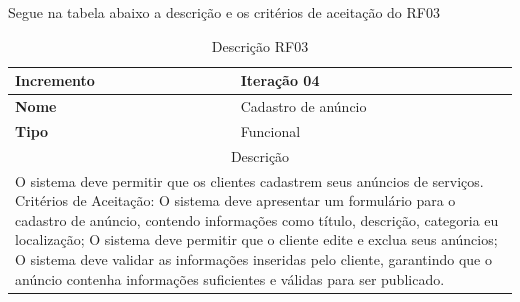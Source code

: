 \clearpage
Segue na tabela abaixo a descrição e os critérios de aceitação do RF03
\begin{table}[htb]
	\centering
	\caption{\label{Formatação do texto.}Descrição RF03}	
	\begin{tabular}{|l|p{11cm}|}
		\hline
		\textbf{Incremento}    & Iteração 04\\ \hline
		\textbf{Nome}    & Cadastro de anúncio\\ \hline
		\textbf{Tipo}    & Funcional\\ \hline
		\multicolumn{2}{|c|}{Descrição}\\ \hline
		\multicolumn{2}{|p{12cm}|}{
			O sistema deve permitir que os clientes cadastrem seus anúncios de serviços. \newline
			\newline Critérios de Aceitação: \newline
			O sistema deve apresentar um formulário para o cadastro de anúncio, contendo informações como título, descrição, categoria eu localização; \newline
			\newline O sistema deve permitir que o cliente edite e exclua seus anúncios;\newline
			\newline O sistema deve validar as informações inseridas pelo cliente, garantindo que o anúncio contenha informações suficientes e válidas para ser publicado.
			} \\ \hline
	\end{tabular}
\end{table}

